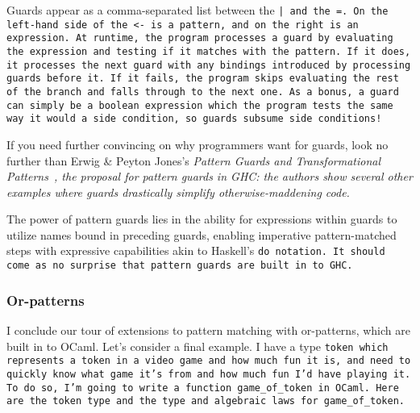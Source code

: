 \documentclass[manuscript,screen,review, 12pt, nonacm]{acmart}
\begin{document}
    Guards appear as a comma-separated list between the \tt{|} and the \tt{=}.
    On the left-hand side of the \tt{<-} is a pattern, and on the right is an
    expression. At runtime, the program processes a guard by evaluating the
    expression and testing if it matches with the pattern. If it does, it
    processes the next guard with any bindings introduced by processing guards
    before it. If it fails, the program skips evaluating the rest of the branch
    and falls through to the next one. As a bonus, a guard can simply be a
    boolean expression which the program tests the same way it would a side
    condition, so guards subsume side conditions! 
    
    If you need further convincing on why programmers want for guards, look no
    further than Erwig \& Peyton Jones's \it{Pattern Guards and Transformational
    Patterns}~\citep{guardproposal}, the proposal for pattern guards in GHC: the
    authors show several other examples where guards drastically simplify
    otherwise-maddening code. 
    
    The power of pattern guards lies in the ability for expressions within
    guards to utilize names bound in preceding guards, enabling imperative
    pattern-matched steps with expressive capabilities akin to Haskell's \tt{do}
    notation. It should come as no surprise that pattern guards are built in to
    GHC. \raggedbottom
\subsubsection{Or-patterns}
    I conclude our tour of extensions to pattern matching with or-patterns,
    which are built in to OCaml. Let's consider a final example. I have a type
    \tt{token} which represents a token in a video game and how much fun it is,
    and need to quickly know what game it's from and how much fun I'd have
    playing it. To do so, I'm going to write a function \tt{game\_of\_token} in
    OCaml. Here are the \tt{token} type and the type and algebraic laws for
    \tt{game\_of\_token}. 
  
\end{document}

